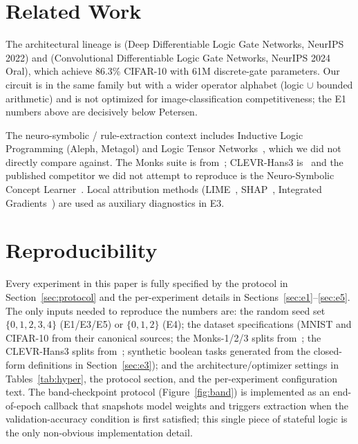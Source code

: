 \documentclass{article}
\begin{document}
\section{Related Work}
\label{sec:related}

The architectural lineage is \citet{petersen2022deep} (Deep Differentiable Logic Gate Networks, NeurIPS 2022) and \citet{petersen2024convolutional} (Convolutional Differentiable Logic Gate Networks, NeurIPS 2024 Oral), which achieve 86.3\% CIFAR-10 with 61M discrete-gate parameters.
Our circuit is in the same family but with a wider operator alphabet (logic $\cup$ bounded arithmetic) and is not optimized for image-classification competitiveness; the E1 numbers above are decisively below Petersen.

The neuro-symbolic / rule-extraction context includes Inductive Logic Programming (Aleph, Metagol) and Logic Tensor Networks~\citep{badreddine2021logic}, which we did not directly compare against.
The Monks suite is from~\citet{thrun1991monks}; CLEVR-Hans3 is~\citet{stammer2021right} and the published competitor we did not attempt to reproduce is the Neuro-Symbolic Concept Learner~\citep{mao2019neuro}.
Local attribution methods (LIME~\citep{ribeiro2016should}, SHAP~\citep{lundberg2017unified}, Integrated Gradients~\citep{sundararajan2017axiomatic}) are used as auxiliary diagnostics in E3.

\section{Reproducibility}
\label{sec:repro}

Every experiment in this paper is fully specified by the protocol in Section~\ref{sec:protocol} and the per-experiment details in Sections~\ref{sec:e1}--\ref{sec:e5}.
The only inputs needed to reproduce the numbers are: the random seed set $\{0, 1, 2, 3, 4\}$ (E1/E3/E5) or $\{0, 1, 2\}$ (E4); the dataset specifications (MNIST and CIFAR-10 from their canonical sources; the Monks-1/2/3 splits from~\citet{thrun1991monks}; the CLEVR-Hans3 splits from~\citet{stammer2021right}; synthetic boolean tasks generated from the closed-form definitions in Section~\ref{sec:e3}); and the architecture/optimizer settings in Tables~\ref{tab:hyper}, the protocol section, and the per-experiment configuration text.
The band-checkpoint protocol (Figure~\ref{fig:band}) is implemented as an end-of-epoch callback that snapshots model weights and triggers extraction when the validation-accuracy condition is first satisfied; this single piece of stateful logic is the only non-obvious implementation detail.
\end{document}
